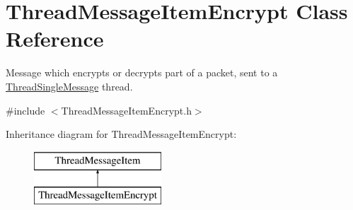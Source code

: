 \hypertarget{class_thread_message_item_encrypt}{
\section{ThreadMessageItemEncrypt Class Reference}
\label{class_thread_message_item_encrypt}
}


Message which encrypts or decrypts part of a packet, sent to a \hyperlink{class_thread_single_message}{ThreadSingleMessage} thread.  




{\ttfamily \#include $<$ThreadMessageItemEncrypt.h$>$}

Inheritance diagram for ThreadMessageItemEncrypt:\begin{figure}[H]
\begin{center}
\leavevmode
\includegraphics[height=2.000000cm]{class_thread_message_item_encrypt}
\end{center}
\end{figure}
